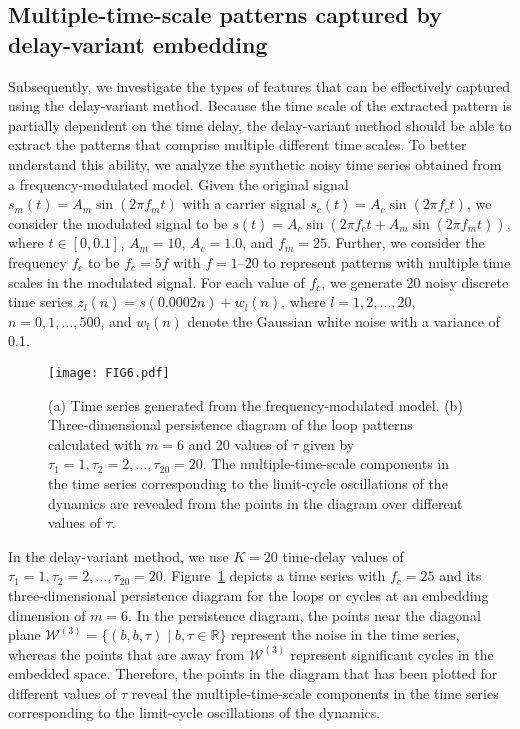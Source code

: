 \documentclass[twocolumn,pre,amsmath,amssymb]{revtex4-1}
\begin{document}
\subsection{Multiple-time-scale patterns captured by delay-variant embedding}
Subsequently, we investigate the types of features that can be effectively captured using the delay-variant method. 
Because the time scale of the extracted pattern is partially dependent on the time delay,
the delay-variant method should be able to extract the patterns that comprise multiple different time scales.
To better understand this ability, we analyze the synthetic noisy time series obtained from a frequency-modulated model. 
Given the original signal $s_m(t)=A_m\sin(2\pi f_mt)$ with a carrier signal $s_c(t)=A_c\sin(2\pi f_c t)$,
we consider the modulated signal to be $s(t)=A_c\sin(2\pi f_c t+A_m\sin(2\pi f_mt))$, 
where $t\in[0, 0.1]$, $A_m=10$, $A_c=1.0$, and $f_m=25$. 
Further, we consider the frequency $f_c$ to be $f_c=5f$ with $f=1\text{--}20$ to
represent patterns with multiple time scales in the modulated signal. 
For each value of $f_c$, we generate 20 noisy discrete time series $z_l(n)=s(0.0002n)+w_l(n)$, 
where $l=1,2,\ldots,20$, $n=0,1,\ldots,500$, and $w_l(n)$ denote the Gaussian white noise with a variance of 0.1.
\begin{figure}
	\texttt{[image: FIG6.pdf]}
	\protect\caption{(a) Time series generated from the frequency-modulated model. (b) Three-dimensional persistence diagram of the loop patterns calculated with $m=6$ and 20 values of $\tau$ given by $\tau_1=1, \tau_2=2, \ldots, \tau_{20}=20$. The multiple-time-scale components in the time series corresponding to the limit-cycle oscillations of the dynamics are revealed from the points in the diagram over different values of $\tau$.
		\label{fig:FM:eg}}
\end{figure}

In the delay-variant method, we use $K=20$ time-delay values of $\tau_1=1, \tau_2=2,\ldots,\tau_{20}=20$.
Figure~\ref{fig:FM:eg} depicts a time series with $f_c=25$ and 
its three-dimensional persistence diagram for the loops or cycles at an embedding dimension of $m=6$.
In the persistence diagram, the points near the diagonal plane 
$\mathcal{W}^{(3)} = \{(b, b, \tau) \mid b,\tau \in \mathbb{R}\}$ 
represent the noise in the time series,
whereas the points that are away from $\mathcal{W}^{(3)}$ 
represent significant cycles in the embedded space.
Therefore, the points in the diagram that has been plotted for different values of $\tau$ 
reveal the multiple-time-scale components in the time series corresponding to the limit-cycle oscillations of the dynamics.
\end{document}
